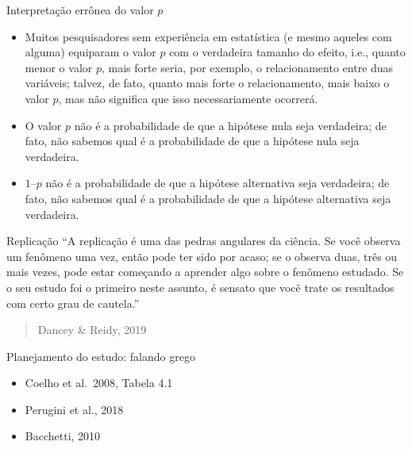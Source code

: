 \documentclass[
  ignorenonframetext,
]{beamer}
\providecommand{\tightlist}{%
  \setlength{\itemsep}{0pt}\setlength{\parskip}{0pt}}
\begin{document}
\begin{frame}{Interpretação errônea do valor \(p\)}
\protect\hypertarget{interpretauxe7uxe3o-erruxf4nea-do-valor-p}{}
\begin{itemize}
\tightlist
\item
  Muitos pesquisadores sem experiência em estatística (e mesmo aqueles
  com alguma) equiparam o valor \(p\) com o verdadeira tamanho do
  efeito, i.e., quanto menor o valor \(p\), mais forte seria, por
  exemplo, o relacionamento entre duas variáveis; talvez, de fato,
  quanto mais forte o relacionamento, mais baixo o valor \(p\), mas não
  significa que isso necessariamente ocorrerá.
\item
  O valor \(p\) não é a probabilidade de que a hipótese nula seja
  verdadeira; de fato, não sabemos qual é a probabilidade de que a
  hipótese nula seja verdadeira.
\item
  \(1 – p\) não é a probabilidade de que a hipótese alternativa seja
  verdadeira; de fato, não sabemos qual é a probabilidade de que a
  hipótese alternativa seja verdadeira.
\end{itemize}
\end{frame}

\begin{frame}{Replicação}
\protect\hypertarget{replicauxe7uxe3o}{}
``A replicação é uma das pedras angulares da ciência. Se você observa um
fenômeno uma vez, então pode ter sido por acaso; se o observa duas, três
ou mais vezes, pode estar começando a aprender algo sobre o fenômeno
estudado. Se o seu estudo foi o primeiro neste assunto, é sensato que
você trate os resultados com certo grau de cautela.''

\begin{quote}
Dancey \& Reidy, 2019
\end{quote}
\end{frame}

\begin{frame}{Planejamento do estudo: falando grego}
\protect\hypertarget{planejamento-do-estudo-falando-grego}{}
\begin{itemize}
\tightlist
\item
  Coelho et al.~2008, Tabela 4.1
\item
  Perugini et al., 2018
\item
  Bacchetti, 2010
\end{itemize}
\end{frame}
\end{document}

